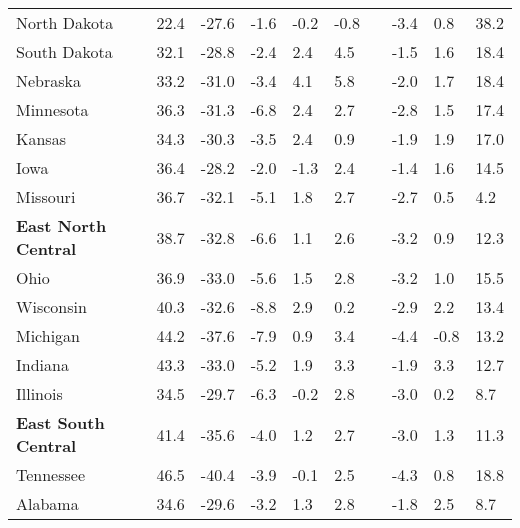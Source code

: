 {\begin{tabular}{p{30mm} R{7mm} R{7mm} R{7mm} R{7mm} 
             R{7mm} p{0mm} R{9mm} R{9mm} R{10mm} }
\hspace{3mm}  North Dakota  & 22.4 & -27.6 & -1.6 & -0.2 & -0.8 &  & -3.4 & 0.8 & 38.2 \\
\hspace{3mm}  South Dakota  & 32.1 & -28.8 & -2.4 & 2.4 & 4.5 &  & -1.5 & 1.6 & 18.4 \\
\hspace{3mm}  Nebraska  & 33.2 & -31.0 & -3.4 & 4.1 & 5.8 &  & -2.0 & 1.7 & 18.4 \\
\hspace{3mm}  Minnesota  & 36.3 & -31.3 & -6.8 & 2.4 & 2.7 &  & -2.8 & 1.5 & 17.4 \\
\hspace{3mm}  Kansas  & 34.3 & -30.3 & -3.5 & 2.4 & 0.9 &  & -1.9 & 1.9 & 17.0 \\
\hspace{3mm}  Iowa  & 36.4 & -28.2 & -2.0 & -1.3 & 2.4 &  & -1.4 & 1.6 & 14.5 \\
\hspace{3mm}  Missouri  & 36.7 & -32.1 & -5.1 & 1.8 & 2.7 &  & -2.7 & 0.5 & 4.2 \\
\hspace{1mm} \textbf{East North Central}  & 38.7 & -32.8 & -6.6 & 1.1 & 2.6 &  & -3.2 & 0.9 & 12.3 \\
\hspace{3mm}  Ohio  & 36.9 & -33.0 & -5.6 & 1.5 & 2.8 &  & -3.2 & 1.0 & 15.5 \\
\hspace{3mm}  Wisconsin  & 40.3 & -32.6 & -8.8 & 2.9 & 0.2 &  & -2.9 & 2.2 & 13.4 \\
\hspace{3mm}  Michigan  & 44.2 & -37.6 & -7.9 & 0.9 & 3.4 &  & -4.4 & -0.8 & 13.2 \\
\hspace{3mm}  Indiana  & 43.3 & -33.0 & -5.2 & 1.9 & 3.3 &  & -1.9 & 3.3 & 12.7 \\
\hspace{3mm}  Illinois  & 34.5 & -29.7 & -6.3 & -0.2 & 2.8 &  & -3.0 & 0.2 & 8.7 \\
\hspace{1mm} \textbf{East South Central}  & 41.4 & -35.6 & -4.0 & 1.2 & 2.7 &  & -3.0 & 1.3 & 11.3 \\
\hspace{3mm}  Tennessee  & 46.5 & -40.4 & -3.9 & -0.1 & 2.5 &  & -4.3 & 0.8 & 18.8 \\
\hspace{3mm}  Alabama  & 34.6 & -29.6 & -3.2 & 1.3 & 2.8 &  & -1.8 & 2.5 & 8.7 \\

\end{tabular}}

